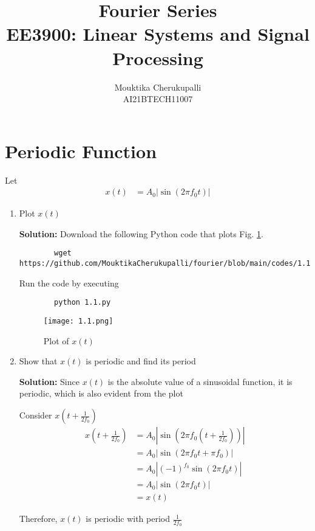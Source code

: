 \documentclass[journal,12pt,twocolumn]{IEEEtran}
\title{Fourier Series \\ \Large EE3900: Linear Systems and Signal Processing }
\author{Mouktika Cherukupalli \\ \normalsize AI21BTECH11007\\ \vspace*{20pt}}
\newcommand{\solution}{\noindent \textbf{Solution: }}
\providecommand{\brak}[1]{\ensuremath{\left(#1\right)}}
\providecommand{\abs}[1]{\left\vert#1\right\vert}
\numberwithin{equation}{section}
\numberwithin{figure}{section}
\renewcommand\thesection{\arabic{section}}
\begin{document}
	\maketitle

	\section{Periodic Function}
	Let 
	\begin{align}
		x(t) &= A_0\abs{\sin\brak{2\pi f_0 t}}
		\label{eq:10-orig-diff-def}
	\end{align}

	\begin{enumerate}[label=\thesection.\arabic*,ref=\thesection.\theenumi]
	\item Plot $x(t)$
	
	\solution Download the following Python code that plots Fig. \ref{fig-1.1}.
	\begin{lstlisting}
		wget https://github.com/MouktikaCherukupalli/fourier/blob/main/codes/1.1.py
	\end{lstlisting}
	
	Run the code by executing
	\begin{lstlisting}
		python 1.1.py
	\end{lstlisting}

	\begin{figure}[!ht]
		\centering
		\texttt{[image: 1.1.png]}
		\caption{Plot of $x(t)$}
		\label{fig-1.1}	
	\end{figure}
	
	\item Show that $x(t)$ is periodic and find its period
	
	\solution Since $x(t)$ is the absolute value of a sinusoidal function, it is periodic, which is also evident from the plot
	
	Consider $x(t+\frac{1}{2f_0})$
	\begin{align}
		x\brak{t+\frac{1}{2f_0}} &= A_0 \abs{\sin\brak{2\pi f_0 \brak{t+\frac{1}{2f_0}}}} \\
		&= A_0 \abs{\sin\brak{2\pi f_0 t + \pi f_0}} \\
		&= A_0\abs{(-1)^{f_0} \sin\brak{2\pi f_0 t}} \\
		&= A_0\abs{\sin\brak{2\pi f_0 t}} \\
		&= x(t)
	\end{align}
	
	Therefore, $x(t)$ is periodic with period $\frac{1}{2f_0}$
	
	\end{enumerate}
	
\end{document}
